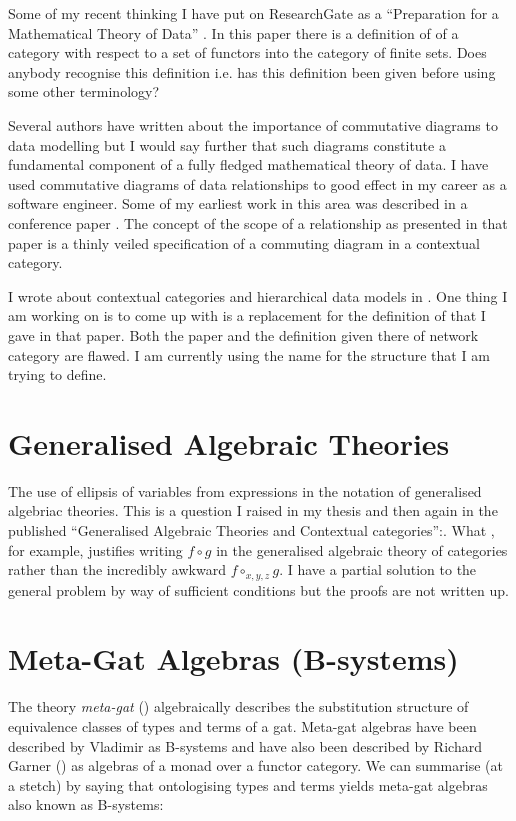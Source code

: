 \documentclass[10pt,a4paper]{article}
\theoremstyle{remark}
\begin{document}
\note
Some of my recent thinking I have put on ResearchGate as a ``Preparation for a Mathematical Theory of Data''
\cite{CartmellPreparation}. In this paper there is a definition of  of a category with respect to a set of functors into the category of finite sets. Does anybody recognise this definition i.e. has this definition been given before using some other terminology? 

\note Several authors have written about the importance of commutative diagrams to data modelling but 
I would say further that such diagrams constitute a fundamental component of a fully fledged mathematical theory of data.
I have used commutative diagrams of data relationships to good effect in my career as a software engineer. 
Some of my earliest work in this area was described in a conference paper  \cite{CartmellScopePaper}. 
The concept of the scope of a relationship as presented in that paper is a thinly veiled
specification of a commuting diagram in a contextual category.

\note
I wrote about contextual categories and hierarchical data models in \cite{CartmellNetworkDataModel}.
One thing I am working on is to come up with is a replacement for the definition 
 of  that I gave in that paper. Both the paper and the definition given there of network category are flawed.
I am currently using the name  for the structure that I am trying to define.

\section{Generalised Algebraic Theories}
\note
The use of ellipsis of variables from expressions in the notation of generalised algebriac theories. 
This is a question I raised in my thesis 
and then again in the published ``Generalised Algebraic Theories and Contextual categories'':. 
What , for example, justifies writing $f \circ g$ in the generalised algebraic theory of categories rather than the incredibly awkward $f \circ_{x,y,z} g$. 
I have a partial solution to the general problem by way of sufficient conditions but the proofs are not written up. 

\section{Meta-Gat Algebras (B-systems)}

\note The theory \textit{meta-gat} (\cite{Cartmell14B}) algebraically describes the substitution structure of equivalence classes of types and terms of a gat. Meta-gat algebras have been described by Vladimir as B-systems and have also been described by Richard Garner (\cite{Garner15}) as algebras of a monad over a functor category.  We can summarise (at a stetch) by saying that ontologising types and terms yields meta-gat algebras also known as B-systems:
\end{document}
